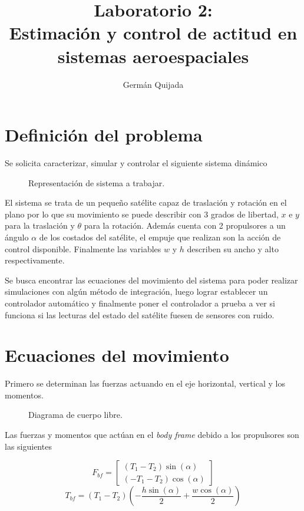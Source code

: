 \documentclass[titlepage, letterpaper]{article}
\title{\textbf{Laboratorio 2:}\\
Estimación y control de actitud en sistemas aeroespaciales}
\author{Germán Quijada}
\begin{document}
\maketitle

\pagebreak
\section{Definición del problema}
Se solicita caracterizar, simular y controlar el siguiente sistema dinámico
\begin{figure}[H]
	\centering
	
	\caption{Representación de sistema a trabajar.}
\end{figure}
El sistema se trata de un pequeño satélite capaz de traslación y rotación en el plano por lo que su movimiento se puede describir con 3 grados de libertad, $x$ e $y$ para la traslación y $\theta$ para la rotación. Además cuenta con 2 propulsores a un ángulo $\alpha$ de los costados del satélite, el empuje que realizan son la acción de control disponible. Finalmente las variables $w$ y $h$ describen su ancho y alto respectivamente.

Se busca encontrar las ecuaciones del movimiento del sistema para poder realizar simulaciones con algún método de integración, luego lograr establecer un controlador automático y finalmente poner el controlador a prueba a ver si funciona si las lecturas del estado del satélite fuesen de sensores con ruido.

\section{Ecuaciones del movimiento}

Primero se determinan las fuerzas actuando en el eje horizontal, vertical y los momentos.

\begin{figure}[H]
	\centering
	
	\caption{Diagrama de cuerpo libre.}
\end{figure}

Las fuerzas y momentos que actúan en el \emph{body frame} debido a los propulsores son las siguientes

\begin{equation*}F_{bf} = \left[\begin{matrix}\left(T_{1} - T_{2}\right) \sin{\left(\alpha \right)}\\\left(- T_{1} - T_{2}\right) \cos{\left(\alpha \right)}\end{matrix}\right]\end{equation*}
\begin{equation*}T_{bf} = \left(T_{1} - T_{2}\right) \left(- \frac{h \sin{\left(\alpha \right)}}{2} + \frac{w \cos{\left(\alpha \right)}}{2}\right)\end{equation*}
\end{document}
